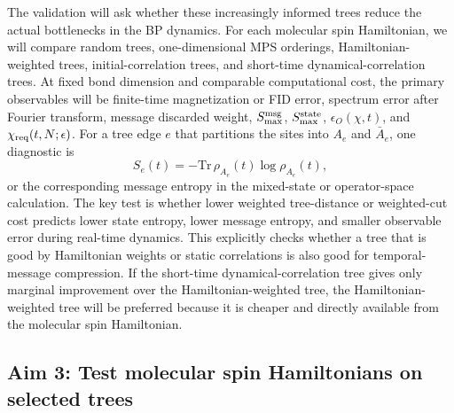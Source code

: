 \documentclass[12pt]{article}
\begin{document}
The validation will ask whether these increasingly informed trees reduce the actual bottlenecks in the BP dynamics.
For each molecular spin Hamiltonian, we will compare random trees, one-dimensional MPS orderings, Hamiltonian-weighted trees, initial-correlation trees, and short-time dynamical-correlation trees.
At fixed bond dimension and comparable computational cost, the primary observables will be finite-time magnetization or FID error, spectrum error after Fourier transform, message discarded weight, \(S_{\max}^{\rm msg}\), \(S_{\max}^{\rm state}\), \(\epsilon_O(\chi,t)\), and \(\chi_{\rm req}(t,N;\epsilon)\).
For a tree edge \(e\) that partitions the sites into \(A_e\) and \(\bar A_e\), one diagnostic is
\begin{equation}
S_e(t)=-\mathrm{Tr}\,\rho_{A_e}(t)\log \rho_{A_e}(t),
\end{equation}
or the corresponding message entropy in the mixed-state or operator-space calculation.
The key test is whether lower weighted tree-distance or weighted-cut cost predicts lower state entropy, lower message entropy, and smaller observable error during real-time dynamics.
This explicitly checks whether a tree that is good by Hamiltonian weights or static correlations is also good for temporal-message compression.
If the short-time dynamical-correlation tree gives only marginal improvement over the Hamiltonian-weighted tree, the Hamiltonian-weighted tree will be preferred because it is cheaper and directly available from the molecular spin Hamiltonian.

\subsection{Aim 3: Test molecular spin Hamiltonians on selected trees}
\end{document}

